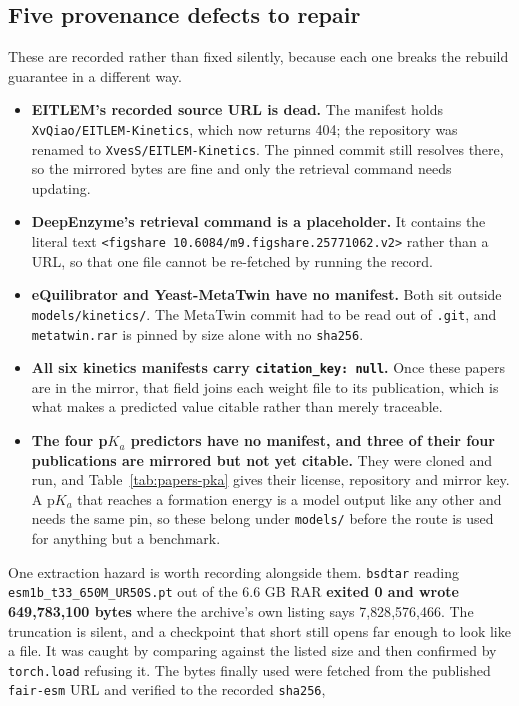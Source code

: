 \subsection{Five provenance defects to repair}
\label{sec:defects}

These are recorded rather than fixed silently, because each one breaks the rebuild
guarantee in a different way.

\begin{itemize}\setlength{\itemsep}{2pt}
  \item \textbf{EITLEM's recorded source URL is dead.} The manifest holds
    \texttt{XvQiao/EITLEM-Kinetics}, which now returns 404; the repository was renamed to
    \texttt{XvesS/EITLEM-Kinetics}. The pinned commit still resolves there, so the mirrored
    bytes are fine and only the retrieval command needs updating.
  \item \textbf{DeepEnzyme's retrieval command is a placeholder.} It contains the literal
    text \texttt{<figshare 10.6084/m9.figshare.25771062.v2>} rather than a URL, so that one
    file cannot be re-fetched by running the record.
  \item \textbf{eQuilibrator and Yeast-MetaTwin have no manifest.} Both sit outside
    \texttt{models/kinetics/}. The MetaTwin commit had to be read out of \texttt{.git}, and
    \texttt{metatwin.rar} is pinned by size alone with no \texttt{sha256}.
  \item \textbf{All six kinetics manifests carry \texttt{citation\_key: null}.} Once these
    papers are in the mirror, that field joins each weight file to its publication, which is
    what makes a predicted value citable rather than merely traceable.
  \item \textbf{The four p$K_a$ predictors have no manifest, and three of their four
    publications are mirrored but not yet citable.} They were cloned and run, and
    Table~\ref{tab:papers-pka} gives their license, repository and mirror key. A p$K_a$ that reaches a formation energy is a model output like any other
    and needs the same pin, so these belong under \texttt{models/} before the route is used
    for anything but a benchmark.
\end{itemize}

One extraction hazard is worth recording alongside them. \texttt{bsdtar} reading
\texttt{esm1b\_t33\_650M\_UR50S.pt} out of the 6.6 GB RAR \textbf{exited 0 and wrote
649{,}783{,}100 bytes} where the archive's own listing says 7{,}828{,}576{,}466. The
truncation is silent, and a checkpoint that short still opens far enough to look like a
file. It was caught by comparing against the listed size and then confirmed by
\texttt{torch.load} refusing it. The bytes finally used were fetched from the published
\texttt{fair-esm} URL and verified to the recorded \texttt{sha256},
